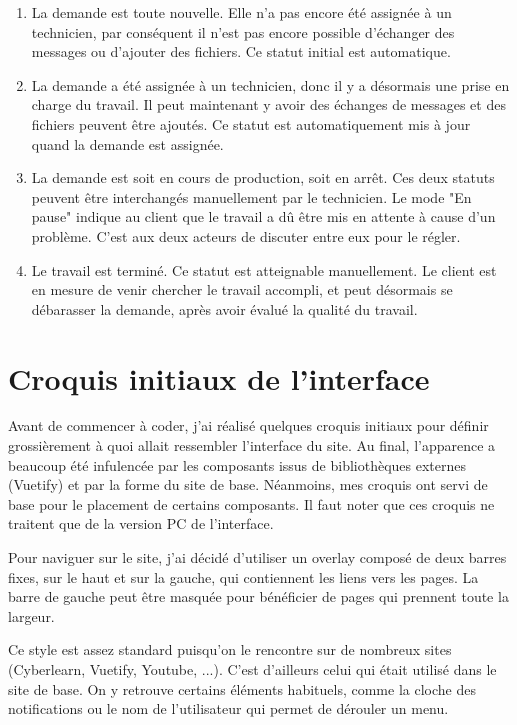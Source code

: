 \documentclass[
    iai, %
    eai, %
]{heig-tb}
\begin{document}
\begin{enumerate}
  \item La demande est toute nouvelle. Elle n'a pas encore été assignée à un technicien, par conséquent il n'est pas encore possible d'échanger des messages ou d'ajouter des fichiers. Ce statut initial est automatique.
  \item La demande a été assignée à un technicien, donc il y a désormais une prise en charge du travail. Il peut maintenant y avoir des échanges de messages et des fichiers peuvent être ajoutés. Ce statut est automatiquement mis à jour quand la demande est assignée.
  \item La demande est soit en cours de production, soit en arrêt. Ces deux statuts peuvent être interchangés manuellement par le technicien. Le mode "En pause" indique au client que le travail a dû être mis en attente à cause d'un problème. C'est aux deux acteurs de discuter entre eux pour le régler.
  \item Le travail est terminé. Ce statut est atteignable manuellement. Le client est en mesure de venir chercher le travail accompli, et peut désormais se débarasser la demande, après avoir évalué la qualité du travail.
\end{enumerate}
\bigskip

\newpage
\section{Croquis initiaux de l'interface}
Avant de commencer à coder, j'ai réalisé quelques croquis initiaux pour définir grossièrement à quoi allait ressembler l'interface du site.
Au final, l'apparence a beaucoup été infulencée par les composants issus de bibliothèques externes (Vuetify) et par la forme du site de base.
Néanmoins, mes croquis ont servi de base pour le placement de certains composants. Il faut noter que ces croquis ne traitent que de la version PC de l'interface.

Pour naviguer sur le site, j'ai décidé d'utiliser un overlay composé de deux barres fixes, sur le haut et sur la gauche, qui contiennent les liens vers les pages.
La barre de gauche peut être masquée pour bénéficier de pages qui prennent toute la largeur.


Ce style est assez standard puisqu'on le rencontre sur de nombreux sites (Cyberlearn, Vuetify, Youtube, ...).
C'est d'ailleurs celui qui était utilisé dans le site de base.
On y retrouve certains éléments habituels, comme la cloche des notifications ou le nom de l'utilisateur qui permet de dérouler un menu.
\end{document}
